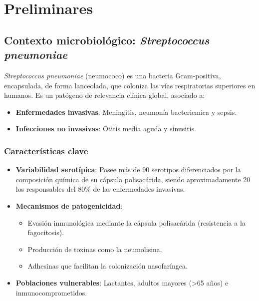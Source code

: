 \chapter{Preliminares}\label{chapter:marcoteorico}

\section{Contexto microbiológico: \textit{Streptococcus pneumoniae}}

\textit{Streptococcus pneumoniae} (neumococo) es una bacteria Gram-positiva, encapsulada, de forma lanceolada, que coloniza las vías respiratorias superiores en humanos. Es un patógeno de relevancia clínica global, asociado a:

\begin{itemize}
    \item \textbf{Enfermedades invasivas}: Meningitis, neumonía bacteriemica y sepsis.
    \item \textbf{Infecciones no invasivas}: Otitis media aguda y sinusitis.
\end{itemize}

\subsection{Características clave}
\begin{itemize}
    \item \textbf{Variabilidad serotípica}: Posee más de 90 serotipos diferenciados por la composición química de su cápsula polisacárida, siendo aproximadamente 20 los responsables del 80\% de las enfermedades invasivas.
    \item \textbf{Mecanismos de patogenicidad}:
    \begin{itemize}
        \item Evasión inmunológica mediante la cápsula polisacárida (resistencia a la fagocitosis).
        \item Producción de toxinas como la neumolisina.
        \item Adhesinas que facilitan la colonización nasofaríngea.
    \end{itemize}
    \item \textbf{Poblaciones vulnerables}: Lactantes, adultos mayores (>65 años) e inmunocomprometidos.
\end{itemize}

